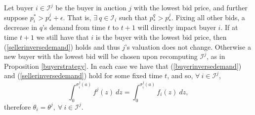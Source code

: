 \documentclass[sigconf, anonymous]{acmart}
\newcommand{\mcI}{\mathcal{I}}
\newcommand{\g}{\sigma}
\theoremstyle{definition}
\begin{document}
Let buyer $i\in\mcI^j$ be the buyer in auction $j$ with the lowest bid price,
and further suppose $p_i^* > p_*^j + \epsilon$. That is, $\exists \ q \in \mcI_i$ such
that $p_*^q > p_*^j$. Fixing all other bids, a decrease in $q$'s demand from time $t$ to $t+1$ will
directly impact buyer $i$. If at time $t+1$ we still have that $i$ is the
buyer with the lowest bid price, then (\ref{sellerinversedemand}) holds and
thus $j$'s valuation does not change. Otherwise a new buyer with the lowest bid will be chosen upon
recomputing $\mcI^j$, as in Proposition \ref{buyerstrategy}. 
In each case we
have that (\ref{buyerinversedemand}) and (\ref{sellerinversedemand}) hold for
some fixed time $t$, and so, $\forall \ i \in\mcI^j$,
\begin{equation}\label{jdemand}
    \int_0^{\g_i^j(a)} f^j(z) \ dz 
    = \int_0^{\g_i^j(a)} f_i(z) \ dz,
\end{equation}
therefore $\theta_i = \theta^j, \ \forall \ i \in \mcI^j$.
\end{document}
